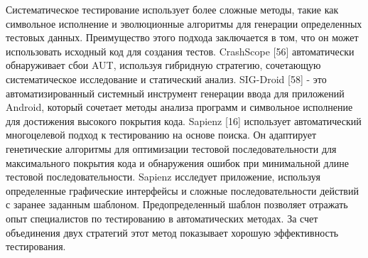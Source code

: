 Систематическое тестирование использует более сложные методы, такие как символьное исполнение и эволюционные алгоритмы для генерации определенных тестовых данных. Преимущество этого подхода заключается в том, что он может использовать исходный код для создания тестов. CrashScope [56] автоматически обнаруживает сбои AUT, используя гибридную стратегию, сочетающую систематическое исследование и статический анализ. SIG-Droid [58] - это автоматизированный системный инструмент генерации ввода для приложений Android, который сочетает методы анализа программ и символьное исполнение для достижения высокого покрытия кода. Sapienz [16] использует автоматический многоцелевой подход к тестированию на основе поиска. Он адаптирует генетические алгоритмы для оптимизации тестовой последовательности для максимального покрытия кода и обнаружения ошибок при минимальной длине тестовой последовательности. Sapienz исследует приложение, используя определенные графические интерфейсы и сложные последовательности действий с заранее заданным шаблоном. Предопределенный шаблон позволяет отражать опыт специалистов по тестированию в автоматических методах. За счет объединения двух стратегий этот метод показывает хорошую эффективность тестирования.

